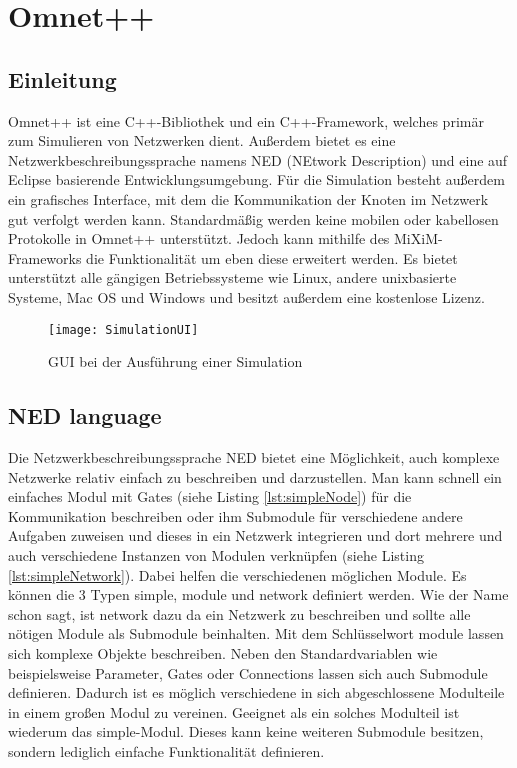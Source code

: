 \section{Omnet++}

\subsection{Einleitung}

Omnet++\cite{omnet} ist eine C++-Bibliothek und ein C++-Framework, welches primär zum Simulieren von Netzwerken dient. Außerdem bietet es eine Netzwerkbeschreibungssprache namens NED (NEtwork Description) und eine auf Eclipse\cite{eclipse} basierende Entwicklungsumgebung. Für die Simulation besteht außerdem ein grafisches Interface, mit dem die Kommunikation der Knoten im Netzwerk gut verfolgt werden kann.
\newline Standardmäßig werden keine mobilen oder kabellosen Protokolle in Omnet++ unterstützt. Jedoch kann mithilfe des MiXiM-Frameworks die Funktionalität um eben diese erweitert werden.
\newline Es bietet unterstützt alle gängigen Betriebssysteme wie Linux, andere unixbasierte Systeme, Mac OS und Windows und besitzt außerdem eine kostenlose Lizenz.

\begin{figure}[htbp]
\centering
\caption{GUI bei der Ausführung einer Simulation }
\label{fig:messageEvent}
\texttt{[image: SimulationUI]}
\end{figure}

\subsection{NED language}

Die Netzwerkbeschreibungssprache NED\cite{ned} bietet eine Möglichkeit, auch komplexe Netzwerke relativ einfach zu beschreiben und darzustellen. Man kann schnell ein einfaches Modul mit Gates (siehe Listing \ref{lst:simpleNode}) für die Kommunikation beschreiben oder ihm Submodule für verschiedene andere Aufgaben zuweisen und dieses in ein Netzwerk integrieren und dort mehrere und auch verschiedene Instanzen von Modulen verknüpfen (siehe Listing \ref{lst:simpleNetwork}).
\newline
Dabei helfen die verschiedenen möglichen Module. Es können die 3 Typen simple, module und network definiert werden. Wie der Name schon sagt, ist network dazu da ein Netzwerk zu beschreiben und sollte alle nötigen Module als Submodule beinhalten. 
\newline
Mit dem Schlüsselwort module lassen sich komplexe Objekte beschreiben. Neben den Standardvariablen wie beispielsweise Parameter, Gates oder Connections lassen sich auch Submodule definieren. Dadurch ist es möglich verschiedene in sich abgeschlossene Modulteile in einem großen Modul zu vereinen.
\newline
Geeignet als ein solches Modulteil ist wiederum das simple-Modul. Dieses kann keine weiteren Submodule besitzen, sondern lediglich einfache Funktionalität definieren.

